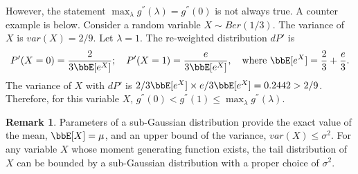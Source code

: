 \documentclass[11pt]{article}
\theoremstyle{plain}
\newtheorem{lem}{Lemma}
\theoremstyle{definition}
\newtheorem{rmk}{Remark}
\begin{document}
\vspace{0.2cm}
However, the statement $\max_{\lambda}g^{''}(\lambda) = g^{''}(0)$ is not always true.  A counter example is below. 
Consider a random variable $X \sim Ber(1/3)$. The variance of $X$ is $var(X) = 2/9$. Let $\lambda = 1$. The re-weighted distribution $dP'$ is
\[ P'(X = 0) = \frac{2}{3\bbE[ e^{X} ]};\quad  P'(X = 1) = \frac{e}{3\bbE[ e^{X} ]}, \quad \text{where } \bbE[ e^{X} ] = \frac{2}{3} + \frac{e}{3}.  \]
The variance of $X$ with $dP'$ is ${2}/{3\bbE[ e^{X} ]} \times  {e}/{3\bbE[ e^{X} ]} = 0.2442 > 2/9$. Therefore, for this variable $X$, $g^{''}(0) <  g^{''}(1) \leq \max_{\lambda}g^{''}(\lambda)$. 
\begin{rmk}
	Parameters of a sub-Gaussian distribution provide the exact value of the mean, $ \bbE[X] = \mu$, and an upper bound of the variance, $var(X) \leq \sigma^2$. For any variable $X$ whose moment generating function exists, the tail distribution of $X$ can be bounded by a sub-Gaussian distribution with a proper choice of $\sigma^2$.
\end{rmk}

\iffalse

\subsection{Exercise 2.6}
\begin{lem}[Lower bounds on squared sub-Gaussians] Let $\{ X_i \}_{i=1}^n$ be i.i.d.\ sequence of zero-mean sub-Gaussian variables with parameter $\sigma$. The normalized summation $Z_n = \frac{1}{n} \sum_{i=1}^n X_i^2$ satisfies
\begin{equation}\label{lem:lowersquare}
	\bbP[Z_n - \bbE[Z_n] \leq \sigma^2 \delta ] \leq e^{-n\delta^2 /16}, \quad \forall \delta \geq 0.
\end{equation}
	The equation~\eqref{lem:lowersquare} implies that the lower tail of the summation of squared sub-Gaussian variables behave in a sub-Gaussian way.
\end{lem}

\begin{proof}
	Given a sub-Gaussian vector $(X_1,...,X_n)$, the moment generating function for $Z_n = \frac{1}{n} \sum_i X_i^2$, $\varphi_{Z_n}(\lambda)$, exists in the neighborhood of $ \lambda = 0$. By the Chernoff bound~\eqref{eq:chernoff1}, there exists a constant $b > 0$ such that
	\begin{equation}
		\bbP[Z_n - \bbE[Z_n] \geq t]  \leq \inf_{\lambda \in (-b,b)} \frac{\bbE[e^{\lambda (Z_n - \bbE[Z_n])}]}{e^{\lambda t}}.
	\end{equation}
	Hence, analysis to the expectation $\bbE[e^{\lambda (Z_n - \bbE[Z_n])}]$ is the key of the proof. Since $X_i$ are i.i.d.\, we re-write the expectation as following
	 \[\bbE[e^{\lambda (Z_n - \bbE[Z_n])}] = (\bbE[ e^{ \frac{\lambda}{n} (X_1^2 - \bbE[X_1]^2)} ])^n. \]
	Let $Z = X_1^2$. Next, we analyze the expectation $\bbE[e^{\lambda (Z - \bbE[Z])}]$.
\end{proof}



\fi
\end{document}
